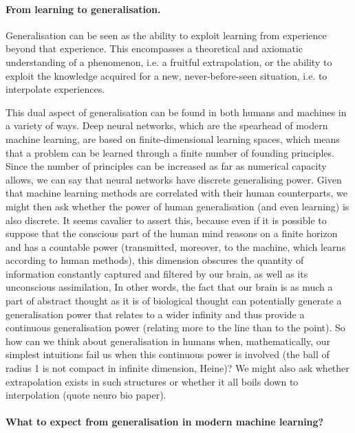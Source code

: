 \paragraph{From learning to generalisation.}

Generalisation can be seen as the ability to exploit learning from experience beyond that experience. This encompasses a theoretical and axiomatic understanding of a phenomenon, i.e. a fruitful extrapolation, or the ability to exploit the knowledge acquired for a new, never-before-seen situation, i.e. to interpolate experiences. 

This dual aspect of generalisation can be found in both humans and machines in a variety of ways. Deep neural networks, which are the spearhead of modern machine learning, are based on finite-dimensional learning spaces, which means that a problem can be learned through a finite number of founding principles. Since the number of principles can be increased as far as numerical capacity allows, we can say that neural networks have discrete generalising power. Given that machine learning methods are correlated with their human counterparts, we might then ask whether the power of human generalisation (and even learning) is also discrete. It seems cavalier to assert this, because even if it is possible to suppose that the conscious part of the human mind reasons on a finite horizon and has a countable power (transmitted, moreover, to the machine, which learns according to human methods), this dimension obscures the quantity of information constantly captured and filtered by our brain, as well as its unconscious assimilation, In other words, the fact that our brain is as much a part of abstract thought as it is of biological thought can potentially generate a generalisation power that relates to a wider infinity and thus provide a continuous generalisation power (relating more to the line than to the point). So how can we think about generalisation in humans when, mathematically, our simplest intuitions fail us when this continuous power is involved (the ball of radius 1 is not compact in infinite dimension, Heine)? We might also ask whether extrapolation exists in such structures or whether it all boils down to interpolation (quote neuro bio paper).

\paragraph{What to expect from generalisation in modern machine learning?}

